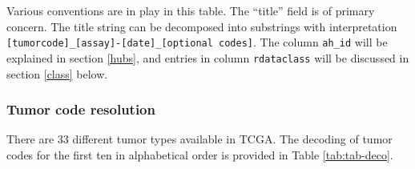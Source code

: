 \documentclass[]{article}
\begin{document}
Various conventions are in play in this table. The ``title'' field is
of primary concern. The title string can be decomposed into
substrings with interpretation
\texttt{{[}tumorcode{]}\_{[}assay{]}-{[}date{]}\_{[}optional codes{]}}. The column \texttt{ah\_id} will be
explained in section \ref{hubs}, and entries in column
\texttt{rdataclass} will be discussed in section \ref{class} below.

\hypertarget{tumor-code-resolution}{%
\subsubsection{Tumor code resolution}\label{tumor-code-resolution}}

There are 33 different tumor types available in TCGA. The
decoding of tumor codes for the first ten in alphabetical order is
provided in Table \ref{tab:tab-deco}.
\end{document}
